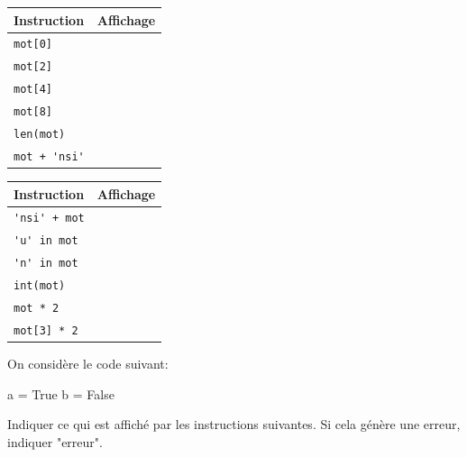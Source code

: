 \documentclass[a4paper,10pt]{report}
\renewcommand{\arraystretch}{1}  %
\def\ptsexoE{2}
\begin{document}
\renewcommand{\arraystretch}{1.2}
    \begin{tabular}{|p{3cm}|p{4cm}|}
        \hline
         Instruction & Affichage\\ \hline
         \verb|mot[0]|&\\\hline
        \verb|mot[2]| &\\\hline
        \verb|mot[4]| &\\\hline
        \verb|mot[8]|&\\\hline
        \verb|len(mot)|&\\\hline
        \verb|mot + 'nsi'| &\\\hline
        
        
    \end{tabular}\hfill
\renewcommand{\arraystretch}{1.2}
    \begin{tabular}{|p{3cm}|p{4cm}|}
        \hline
         Instruction & Affichage\\ \hline
        \verb|'nsi' + mot|&\\\hline
        \verb|'u' in mot|&\\\hline
        \verb|'n' in mot|&\\\hline
        \verb|int(mot)|&\\\hline
        \verb|mot * 2| &\\\hline
        \verb|mot[3] * 2| &\\\hline
        
        


    \end{tabular}

\bigskip

\exods{\ptsexoE}

On considère le code suivant:

\begin{CodePythontexAlt}[TaillePolice=\large,Largeur=1\linewidth,Centre,PremLigne=1]{}
a = True
b = False
\end{CodePythontexAlt}


Indiquer ce qui est affiché par les instructions suivantes. Si cela génère une erreur, indiquer "erreur".
\end{document}
